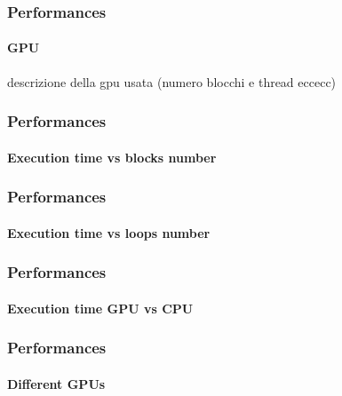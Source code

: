 \begin{frame}
\frametitle{Performances}
\framesubtitle{GPU}
\begin{center}
descrizione della gpu usata (numero blocchi e thread eccecc)
\end{center}
\end{frame}

\begin{frame}
\frametitle{Performances}
\framesubtitle{Execution time vs blocks number}
\begin{center}
\end{center}
\end{frame}

\begin{frame}
\frametitle{Performances}
\framesubtitle{Execution time vs loops number}
\begin{center}
\end{center}
\end{frame}

\begin{frame}
\frametitle{Performances}
\framesubtitle{Execution time GPU vs CPU}
\begin{center}
\end{center}
\end{frame}

\begin{frame}
\frametitle{Performances}
\framesubtitle{Different GPUs}
\begin{center}
\end{center}
\end{frame}